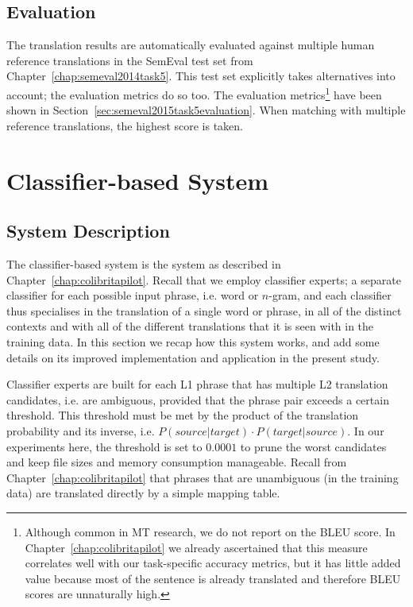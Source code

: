 \subsection{Evaluation}

The translation results are automatically evaluated against multiple human
reference translations in the SemEval test set from
Chapter~\ref{chap:semeval2014task5}. This test set explicitly takes alternatives
into account; the evaluation metrics do so too. The evaluation
metrics\footnote{Although common in MT research, we do not report on the BLEU \citep{BLEU} score. In
Chapter~\ref{chap:colibritapilot} we already ascertained that this measure correlates well with
our task-specific accuracy metrics, but it has little added value because most of the sentence is already
translated and therefore BLEU scores are unnaturally high.} have been shown in
Section~\ref{sec:semeval2015task5evaluation}. When matching with multiple reference translations, the highest
score is taken. 

\section{Classifier-based System}

\label{sec:classifierbased}

\subsection{System Description}

The classifier-based system is the system as described in
Chapter~\ref{chap:colibritapilot}. Recall that we employ classifier experts; a
separate classifier for each possible input phrase, i.e. word or $n$-gram, and
each classifier thus specialises in the translation of a single word or phrase,
in all of the distinct contexts and with all of the different translations that
it is seen with in the training data. In this section we recap how this system
works, and add some details on its improved implementation and application in
the present study.

Classifier experts are built for each L1 phrase that has multiple L2
translation candidates, i.e. are ambiguous, provided that the phrase pair
exceeds a certain threshold. This threshold must be met by the product of the
translation probability and its inverse, i.e. $P(source|target) \cdot
P(target|source)$.  In our experiments here, the threshold is set to $0.0001$
to prune the worst candidates and keep file sizes and memory consumption
manageable. Recall from Chapter~\ref{chap:colibritapilot} that phrases that are
unambiguous (in the training data) are translated directly by a simple mapping
table.

